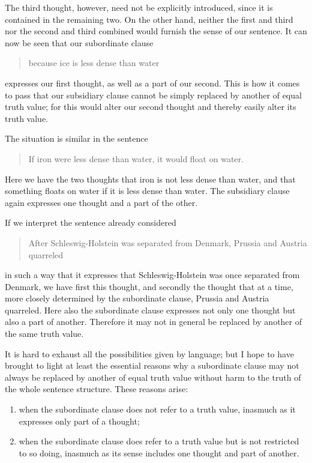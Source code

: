 \documentclass[twoside,12pt,a4paper]{article}
\begin{document}
The third thought, however, need not be explicitly introduced, since
it is contained in the remaining two. On the other hand, neither the
first and third nor the second and third combined would furnish the
sense of our sentence. It can now be seen that our subordinate clause

\begin{quote}
  because ice is less dense than water
\end{quote}

\noindent expresses our first thought, as well as a part of our second. This is
how it comes to pass that our subsidiary clause cannot be simply
replaced by another of equal truth value; for this would alter our
second thought and thereby easily alter its truth value.

The situation is similar in the sentence

\begin{quote}
  If iron were less dense than water, it would float on water.
\end{quote}

Here we have the two thoughts that iron is not less dense than water,
and that something floats on water if it is less dense than water. The
subsidiary clause again expresses one thought and a part of the other.

If we interpret the sentence already considered

\begin{quote}
  After Schleswig-Holstein was separated from Denmark, Prussia and
  Austria quarreled
\end{quote}

\noindent in such a way that it expresses that Schleswig-Holstein was
once separated from Denmark, we have first this thought, and secondly
the thought that at a time, more closely determined by the subordinate
clause, Prussia and Austria quarreled. Here also the subordinate
clause expresses not only one thought but also a part of another.
Therefore it may not in general be replaced by another of the same
truth value.

It is hard to exhaust all the possibilities given by language; but I
hope to have brought to light at least the essential reasons why a
subordinate clause may not always be replaced by another of equal
truth value without harm to the truth of the whole sentence structure.
These reasons arise:

\begin{enumerate}[label={(\arabic*)}]
\item when the subordinate clause does not refer to a truth value,
  inasmuch as it expresses only part of a thought;
\item when the subordinate clause does refer to a truth value but is
  not restricted to so doing, inasmuch as its sense includes one
  thought and part of another.
\end{enumerate}
\end{document}
